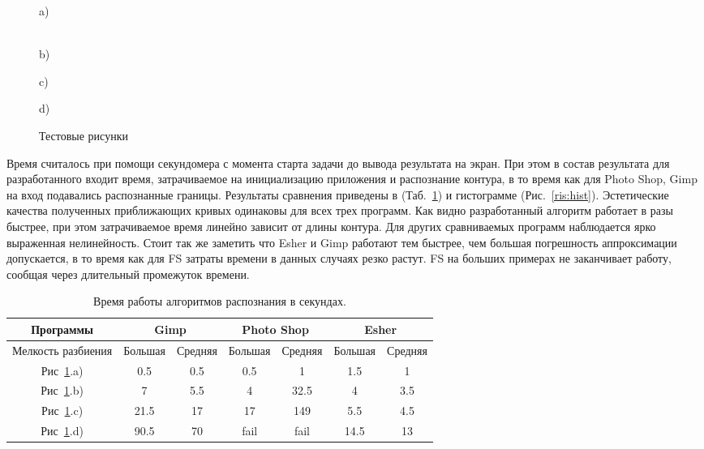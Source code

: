 \documentclass[a4paper,12pt]{report}
\begin{document}
\begin{figure}[h!]
\begin{minipage}[h]{0.47\linewidth}
 a) \\
\end{minipage}
\hfill
\begin{minipage}[h]{0.47\linewidth}
 \\b)
\end{minipage}
\vfill
\begin{minipage}[h]{0.47\linewidth}
 c) \\
\end{minipage}
\hfill
\begin{minipage}[h]{0.47\linewidth}
 d) \\
\end{minipage}
\caption{Тестовые рисунки}
\label{ris:test}
\end{figure}

Время считалось при помощи секундомера с момента старта задачи до вывода результата на экран. При этом в состав результата для разработанного входит время, затрачиваемое на инициализацию приложения и распознание контура, в то время как для Photo Shop, Gimp на вход подавались распознанные границы. Результаты сравнения приведены в (Таб.~\ref{tab:time}) и гистограмме  (Рис.~\ref{ris:hist}). Эстетические качества полученных приближающих кривых одинаковы для всех трех программ. Как видно разработанный алгоритм работает в разы быстрее, при этом затрачиваемое время линейно зависит от длины контура. Для других сравниваемых программ наблюдается ярко выраженная нелинейность. Стоит так же заметить что Esher и Gimp работают тем быстрее, чем большая погрешность аппроксимации допускается, в то время как для FS затраты времени в данных случаях резко растут. FS на больших примерах не заканчивает работу, сообщая через длительный промежуток времени.

\begin{table}[h!]
\caption{Время работы алгоритмов распознания в секундах.}
\begin{center}
\begin{tabular}{|c|c|c|c|c|c|c|}
\hline
Программы& \multicolumn{2}{c|}{Gimp} & \multicolumn{2}{c|}{Photo Shop}& \multicolumn{2}{c|}{Esher}\\
\hline
Мелкость разбиения & Большая & Средняя & Большая & Средняя & Большая & Средняя\\
\hline
Рис~\ref{ris:test}.a) & 0.5 & 0.5 & 0.5 & 1 & 1.5 & 1  \\
\hline
Рис~\ref{ris:test}.b) & 7 & 5.5 & 4 & 32.5 & 4 & 3.5  \\
\hline
Рис~\ref{ris:test}.c) & 21.5 & 17 & 17 & 149 & 5.5 & 4.5  \\
\hline
Рис~\ref{ris:test}.d) & 90.5 & 70 & fail & fail & 14.5 & 13 \\
\hline
\end{tabular}
\end{center}
\label{tab:time}
\end{table}
\end{document}
